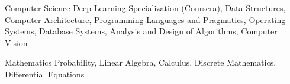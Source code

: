 

\begin{cvskills}

  \cvskill
    {Computer Science} %
    {{\href{https://www.coursera.org/specializations/deep-learning}{Deep Learning Specialization (Coursera)}}, Data Structures, Computer Architecture, Programming Languages \newline and Pragmatics, Operating Systems, Database Systems, Analysis and Design of Algorithms, Computer Vision} %


  \cvskill
    {Mathematics} %
    {Probability, Linear Algebra, Calculus, Discrete Mathematics, Differential Equations} %


\end{cvskills}
